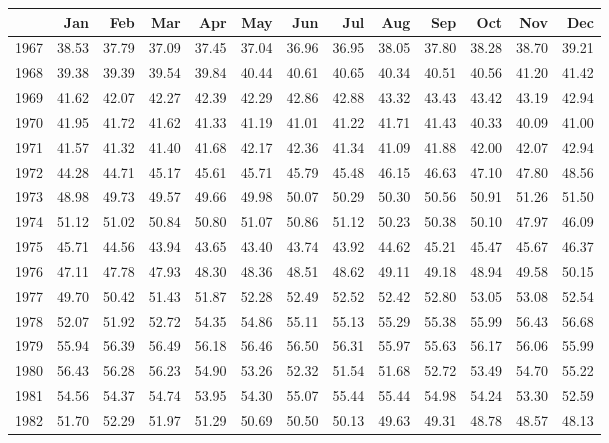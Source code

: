 \begin{longtable}{rrrrrrrrrrrrr}
  \hline
 & Jan & Feb & Mar & Apr & May & Jun & Jul & Aug & Sep & Oct & Nov & Dec \\ 
  \hline
1967 & 38.53 & 37.79 & 37.09 & 37.45 & 37.04 & 36.96 & 36.95 & 38.05 & 37.80 & 38.28 & 38.70 & 39.21 \\ 
  1968 & 39.38 & 39.39 & 39.54 & 39.84 & 40.44 & 40.61 & 40.65 & 40.34 & 40.51 & 40.56 & 41.20 & 41.42 \\ 
  1969 & 41.62 & 42.07 & 42.27 & 42.39 & 42.29 & 42.86 & 42.88 & 43.32 & 43.43 & 43.42 & 43.19 & 42.94 \\ 
  1970 & 41.95 & 41.72 & 41.62 & 41.33 & 41.19 & 41.01 & 41.22 & 41.71 & 41.43 & 40.33 & 40.09 & 41.00 \\ 
  1971 & 41.57 & 41.32 & 41.40 & 41.68 & 42.17 & 42.36 & 41.34 & 41.09 & 41.88 & 42.00 & 42.07 & 42.94 \\ 
  1972 & 44.28 & 44.71 & 45.17 & 45.61 & 45.71 & 45.79 & 45.48 & 46.15 & 46.63 & 47.10 & 47.80 & 48.56 \\ 
  1973 & 48.98 & 49.73 & 49.57 & 49.66 & 49.98 & 50.07 & 50.29 & 50.30 & 50.56 & 50.91 & 51.26 & 51.50 \\ 
  1974 & 51.12 & 51.02 & 50.84 & 50.80 & 51.07 & 50.86 & 51.12 & 50.23 & 50.38 & 50.10 & 47.97 & 46.09 \\ 
  1975 & 45.71 & 44.56 & 43.94 & 43.65 & 43.40 & 43.74 & 43.92 & 44.62 & 45.21 & 45.47 & 45.67 & 46.37 \\ 
  1976 & 47.11 & 47.78 & 47.93 & 48.30 & 48.36 & 48.51 & 48.62 & 49.11 & 49.18 & 48.94 & 49.58 & 50.15 \\ 
  1977 & 49.70 & 50.42 & 51.43 & 51.87 & 52.28 & 52.49 & 52.52 & 52.42 & 52.80 & 53.05 & 53.08 & 52.54 \\ 
  1978 & 52.07 & 51.92 & 52.72 & 54.35 & 54.86 & 55.11 & 55.13 & 55.29 & 55.38 & 55.99 & 56.43 & 56.68 \\ 
  1979 & 55.94 & 56.39 & 56.49 & 56.18 & 56.46 & 56.50 & 56.31 & 55.97 & 55.63 & 56.17 & 56.06 & 55.99 \\ 
  1980 & 56.43 & 56.28 & 56.23 & 54.90 & 53.26 & 52.32 & 51.54 & 51.68 & 52.72 & 53.49 & 54.70 & 55.22 \\ 
  1981 & 54.56 & 54.37 & 54.74 & 53.95 & 54.30 & 55.07 & 55.44 & 55.44 & 54.98 & 54.24 & 53.30 & 52.59 \\ 
  1982 & 51.70 & 52.29 & 51.97 & 51.29 & 50.69 & 50.50 & 50.13 & 49.63 & 49.31 & 48.78 & 48.57 & 48.13 \\ 

\end{longtable}
